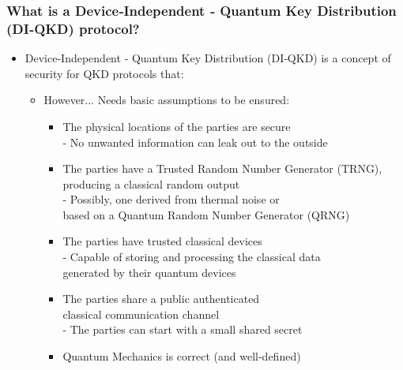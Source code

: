 \documentclass{beamer}
\begin{document}
		\begin{frame}
			\frametitle{\footnotesize What is a Device‑Independent ‑ Quantum Key Distribution (DI‑QKD) protocol?}

            \vspace{2.5ex}
            \begin{itemize}
                \item Device‑Independent ‑ Quantum Key Distribution (DI‑QKD) is a concept of security for QKD protocols that:
                \begin{itemize}
                    \item However... Needs basic assumptions to be ensured:
                    \begin{itemize}
                        \item The physical locations of the parties are secure\\
                        - No unwanted information can leak out to the outside
                        \item The parties have a Trusted Random Number Generator (TRNG), producing a classical random output\\
                        - Possibly, one derived from thermal noise or \\\hspace{0.5em}based on a Quantum Random Number Generator (QRNG)
                        \item The parties have trusted classical devices\\
                        - Capable of storing and processing the classical data\\\hspace{0.5em}generated by their quantum devices
                        \item The parties share a public authenticated\\classical communication channel\\
                        - The parties can start with a small shared secret
                        \item Quantum Mechanics is correct (and well-defined)
                    \end{itemize}
                \end{itemize}
            \end{itemize}
		\end{frame}
\end{document}
